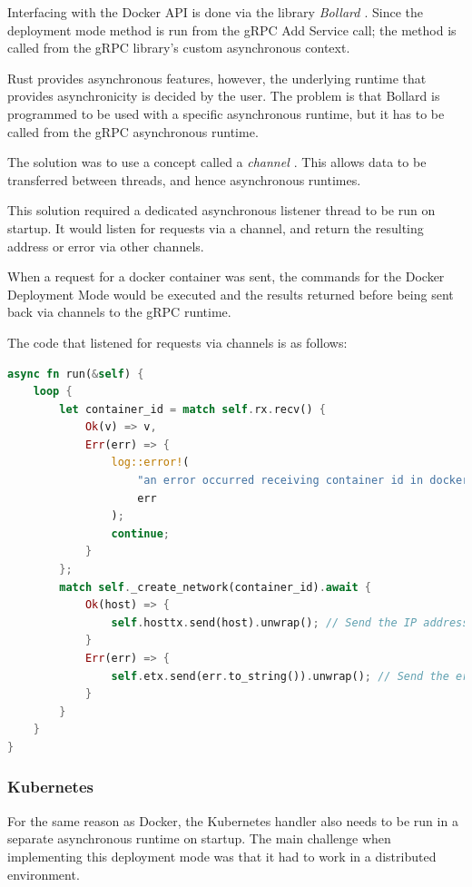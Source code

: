 \documentclass[a4paper,12pt]{report}
\begin{document}
Interfacing with the Docker API is done via the library \textit{Bollard \cite{bollard}}. 
Since the deployment mode method is run from the gRPC Add Service call; the method is called from the gRPC library's custom asynchronous context.

Rust provides asynchronous features, however, the underlying runtime that provides asynchronicity is decided by the user. The problem is that
Bollard is programmed to be used with a specific asynchronous runtime, but it has to be called from the gRPC asynchronous runtime.

The solution was to use a concept called a \textit{channel \cite{channel}}. This allows data to be transferred between threads, and hence asynchronous runtimes.

This solution required a dedicated asynchronous listener thread to be run on startup. It would listen for requests via a channel, and return the resulting address or error via other channels.

When a request for a docker container was sent, the commands for the Docker Deployment Mode would be executed and the results returned before being sent back via channels to the gRPC runtime.

The code that listened for requests via channels is as follows:

\begin{lstlisting}[language=Rust]
async fn run(&self) {
    loop {
        let container_id = match self.rx.recv() {
            Ok(v) => v,
            Err(err) => {
                log::error!(
                    "an error occurred receiving container id in docker network runtime: {}",
                    err
                );
                continue;
            }
        };
        match self._create_network(container_id).await {
            Ok(host) => {
                self.hosttx.send(host).unwrap(); // Send the IP address back if successful
            }
            Err(err) => {
                self.etx.send(err.to_string()).unwrap(); // Send the error if unsuccessful.
            }
        }
    }
}
\end{lstlisting}

\subsubsection{Kubernetes}
For the same reason as Docker, the Kubernetes handler also needs to be run in a separate asynchronous runtime on startup.
The main challenge when implementing this deployment mode was that it had to work in a distributed environment.
\end{document}
